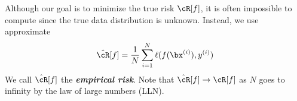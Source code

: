 \documentclass{article}
\begin{document}
Although our goal is to minimize the true risk $\cR[f]$, it is often impossible to compute since the true data distribution is unknown.
Instead, we use approximate 
\begin{align}
    \hat{\cR}[f] = \frac{1}{N}\sum_{i=1}^N \ell(f(\bx^{(i)}), y^{(i)})
\end{align}
We call $\hat{\cR}[f]$ the {\it\bf empirical risk}.
Note that $\hat{\cR}[f] \rightarrow \cR[f]$ as $N$ goes to infinity by the law of large numbers (LLN).

% 
% 
\end{document}
